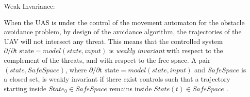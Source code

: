 \begin{note}{Weak Invariance:}

When the UAS is under the control of the movement automaton  for the obstacle avoidance problem,  by design of the avoidance algorithm, the trajectories of the UAV will not intersect any threat. This means that the controlled system $\partial/\partial \text{t state} =model(state,input)$ is \emph{weakly invariant} with respect to the complement of the threats, and with respect to the free space. A pair $(state, SafeSpace)$, where $\partial/\partial \text{t state} =model(state,input)$ and $SafeSpace$ is a closed set, is weakly invariant if there exist controls such that a trajectory starting inside $State_0\in SafeSpace$ remains inside $State (t)\in SafeSpace$ \cite{blanchini1999set}.
 \end{note}